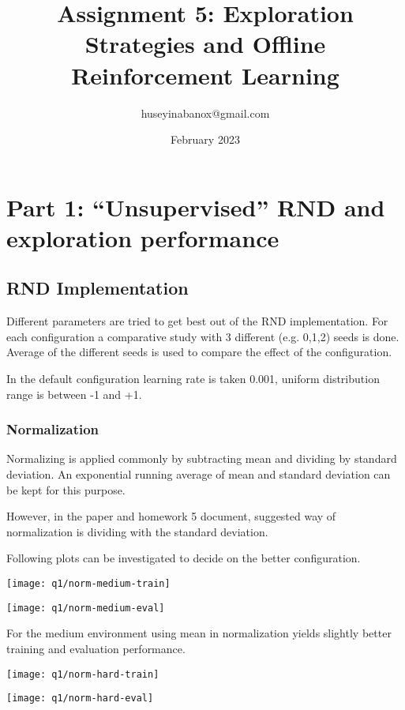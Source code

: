 \documentclass[11pt]{article}
\title{Assignment 5: Exploration Strategies and Offline Reinforcement Learning}
\author{huseyinabanox@gmail.com}
\date{February 2023}
\begin{document}
    \maketitle

    \section{Part 1: “Unsupervised” RND and exploration performance}

    \subsection{RND Implementation}

    Different parameters are tried to get best out of the RND implementation.
    For each configuration a comparative study with 3 different (e.g. 0,1,2) seeds is done.
    Average of the different seeds is used to compare the effect of the configuration.

    In the default configuration learning rate is taken 0.001, uniform distribution range is between -1 and +1.

    \subsubsection{Normalization}

    Normalizing is applied commonly by subtracting mean and dividing by standard deviation.
    An exponential running average of mean and standard deviation can be kept for this purpose.

    However, in the paper and homework 5 document, suggested way of normalization is dividing with the standard deviation.

    Following plots can be investigated to decide on the better configuration.

    \hspace*{-0.6in}
    \texttt{[image: q1/norm-medium-train]}

    \hspace*{-0.6in}
    \texttt{[image: q1/norm-medium-eval]}

    For the medium environment using mean in normalization yields slightly better training and evaluation performance.

    \hspace*{-0.6in}
    \texttt{[image: q1/norm-hard-train]}

    \hspace*{-0.6in}
    \texttt{[image: q1/norm-hard-eval]}
\end{document}
